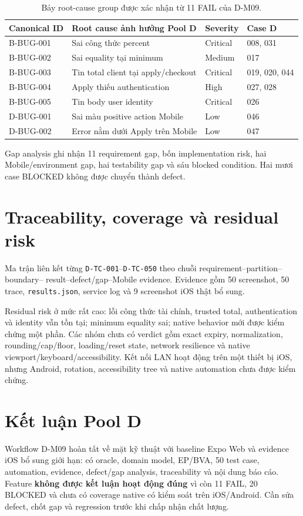 \begin{table}[H]
  \centering
  \small
  \begin{tabular}{p{}p{}p{}p{}}
    \toprule
    Canonical ID & Root cause ảnh hưởng Pool D & Severity & Case D \\
    \midrule
    B-BUG-001 & Sai công thức percent & Critical & 008, 031 \\
    B-BUG-002 & Sai equality tại minimum & Medium & 017 \\
    B-BUG-003 & Tin total client tại apply/checkout & Critical & 019, 020, 044 \\
    B-BUG-004 & Apply thiếu authentication & High & 027, 028 \\
    B-BUG-005 & Tin body user identity & Critical & 026 \\
    D-BUG-001 & Sai màu positive action Mobile & Low & 046 \\
    D-BUG-002 & Error nằm dưới Apply trên Mobile & Low & 047 \\
    \bottomrule
  \end{tabular}
  \caption{Bảy root-cause group được xác nhận từ 11 FAIL của D-M09.}
  \label{tab:d-m09-defects}
\end{table}

Gap analysis ghi nhận 11 requirement gap, bốn implementation risk, hai
Mobile/environment gap, hai testability gap và sáu blocked condition. Hai mươi
case BLOCKED không được chuyển thành defect.

\section{Traceability, coverage và residual risk}

Ma trận  liên kết từng
\texttt{D-TC-001}--\texttt{D-TC-050} theo chuỗi requirement--partition--boundary--
result--defect/gap--Mobile evidence. Evidence gồm 50 screenshot, 50 trace,
\texttt{results.json}, service log và 9 screenshot iOS thật bổ sung.

Residual risk ở mức rất cao: lỗi công thức tài chính, trusted total,
authentication và identity vẫn tồn tại; minimum equality sai; native behavior
mới được kiểm chứng một phần. Các nhóm chưa có verdict gồm exact expiry, normalization,
rounding/cap/floor, loading/reset state, network resilience và native
viewport/keyboard/accessibility. Kết nối LAN hoạt động trên một thiết bị iOS,
nhưng Android, rotation, accessibility tree và native automation chưa được kiểm chứng.

\section{Kết luận Pool D}

Workflow D-M09 hoàn tất về mặt kỹ thuật với baseline Expo Web và evidence iOS
bổ sung giới hạn: có oracle,
domain model, EP/BVA, 50 test case, automation, evidence, defect/gap analysis,
traceability và nội dung báo cáo. Feature \textbf{không được kết luận hoạt động
đúng} vì còn 11 FAIL, 20 BLOCKED và chưa có coverage native có kiểm soát trên
iOS/Android. Cần sửa defect, chốt gap và regression trước khi chấp nhận chất lượng.
